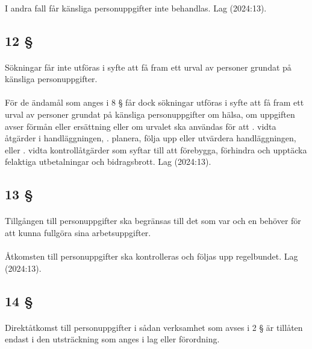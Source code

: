 \documentclass[a4paper,notitlepage,openany,10pt]{book}
\begin{document}
\paragraph*{}
I andra fall får känsliga personuppgifter inte behandlas.
Lag (2024:13).
\subsection*{12 §}
\paragraph*{}
Sökningar får inte utföras i syfte att få fram ett urval av personer grundat på känsliga personuppgifter.
\paragraph*{}
För de ändamål som anges i 8 § får dock sökningar utföras i syfte att få fram ett urval av personer grundat på känsliga personuppgifter om hälsa, om uppgiften avser förmån eller ersättning eller om urvalet ska användas för att
. vidta åtgärder i handläggningen,
. planera, följa upp eller utvärdera handläggningen, eller
. vidta kontrollåtgärder som syftar till att förebygga, förhindra och upptäcka felaktiga utbetalningar och bidragsbrott.
Lag (2024:13).
\subsection*{13 §}
\paragraph*{}
Tillgången till personuppgifter ska begränsas till det som var och en behöver för att kunna fullgöra sina arbetsuppgifter.
\paragraph*{}
Åtkomsten till personuppgifter ska kontrolleras och följas upp regelbundet.
Lag (2024:13).
\subsection*{14 §}
\paragraph*{}
Direktåtkomst till personuppgifter i sådan verksamhet som avses i 2 § är tillåten endast i den utsträckning som anges i lag eller förordning.
\end{document}
